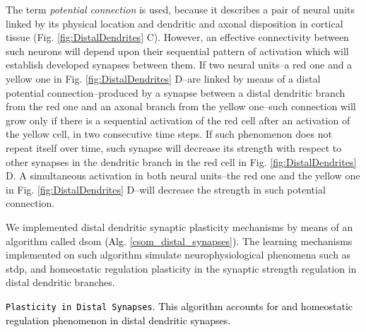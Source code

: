 \documentclass[10pt,letterpaper]{article}
\newcommand{\reviewerfour}[1]{\textcolor{black}{#1}}
\begin{document}
The term \emph{potential connection} is used, because it describes a pair of neural units linked by its physical location and dendritic and axonal disposition in cortical tissue (Fig. \ref{fig:DistalDendrites} C). However, an effective connectivity between such neurons will depend upon their sequential pattern of activation which will establish developed synapses between them. If two neural units--a red one and a yellow one in Fig. \ref{fig:DistalDendrites} D--are linked by means of a distal potential connection--produced by a synapse between a distal dendritic branch from the red one and an axonal branch from the yellow one--such connection will grow only if there is a sequential activation of the red cell after an activation of the yellow cell, in two consecutive time steps. If such phenomenon does not repeat itself over time, such synapse will decrease its strength with respect to other synapses in the dendritic branch in the red cell in Fig. \ref{fig:DistalDendrites} D. A simultaneous activation in both neural units--the red one and the yellow one in Fig. \ref{fig:DistalDendrites} D--will decrease the strength in such potential connection.

We implemented distal dendritic synaptic plasticity mechanisms by means of an algorithm called \gls{dsom} \reviewerfour{(Alg. \ref{csom_distal_synapses})}.
The learning mechanisms implemented on such algorithm simulate neurophysiological phenomena
such as \gls{stdp}, and homeostatic regulation plasticity in the synaptic strength regulation in
distal dendritic branches.

\begin{algorithm}
	\caption{\reviewerfour{\texttt{Plasticity in Distal Synapses}. This algorithm accounts for \glsfirst{stdp} and homeostatic regulation phenomenon in distal dendritic synapses.}}
\label{csom_distal_synapses}
\begin{algorithmic}[1]
		\ENDFOR
	\ENDFOR
		\ENDFOR
	\ENDFOR
				\ENDIF
			\ENDFOR
		\ENDFOR
	\ENDIF
\end{algorithmic}
\end{algorithm}
\end{document}
